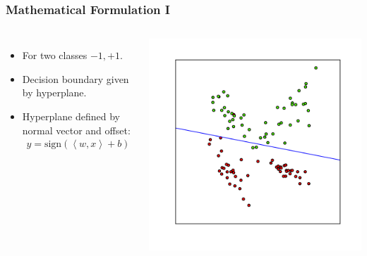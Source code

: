 \begin{frame}
    \frametitle{Mathematical Formulation I}
    \begin{columns}
        \begin{itemize}
            \item For two classes $-1, +1$.
            \item Decision boundary given by hyperplane.
            \item Hyperplane defined by normal vector and offset:
                \begin{align*}
                    y = \text{sign}(\left<w, x\right> + b)
                \end{align*}
        \end{itemize}
            \includegraphics[width=1\linewidth]{logreg-pics/synthetic_line}\\

    \end{columns}
\end{frame}

